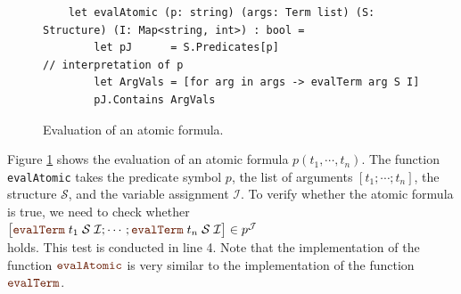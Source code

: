 \begin{figure}[!ht]
\centering
\begin{verbatim}
    let evalAtomic (p: string) (args: Term list) (S: Structure) (I: Map<string, int>) : bool =
        let pJ      = S.Predicates[p]                       // interpretation of p
        let ArgVals = [for arg in args -> evalTerm arg S I]
        pJ.Contains ArgVals
\end{verbatim}
\vspace*{-0.3cm}
\caption{Evaluation of an atomic formula.}
\label{fig:evalAtomic.ipynb}
\end{figure}

Figure \ref{fig:evalAtomic.ipynb} shows the evaluation of an atomic formula $p(t_1, \cdots, t_n)$.  The function
\texttt{evalAtomic} takes the predicate symbol $p$, the list of arguments $[t_1; \cdots; t_n]$, the structure
$\mathcal{S}$, and the variable assignment $\mathcal{I}$.
To verify whether the atomic formula is true, we need to check whether
\\[0.2cm]
\hspace*{1.3cm}
$\bigl[\mytt{evalTerm}\;t_1\;\mathcal{S}\;\mathcal{I}; \cdots; \mytt{evalTerm}\;t_n\;\mathcal{S}\;\mathcal{I}\bigr]\in p^\mathcal{J}$
\\[0.2cm]
holds. This test is conducted in line 4. Note that the implementation of the function
$\mytt{evalAtomic}$ is very similar to the implementation of the function $\mytt{evalTerm}$.



